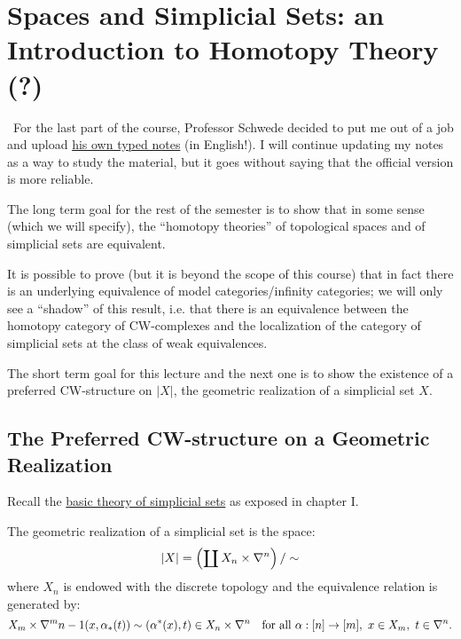 
\chapter{Spaces and Simplicial Sets: an Introduction to Homotopy Theory (?)}\label{chapter:the-cool-chapter}

\Attention\ For the last part of the course, Professor Schwede decided to put me out of a job and upload \href{https://www.math.uni-bonn.de/people/schwede/sset_vs_spaces.pdf}{his own typed notes} (in English!). I will continue updating my notes as a way to study the material, but it goes without saying that the official version is more reliable.\medskip


The long term goal for the rest of the semester is to show that in some sense (which we will specify), the \enquote{homotopy theories} of topological spaces and of simplicial sets are equivalent.

It is possible to prove (but it is beyond the scope of this course) that in fact there is an underlying equivalence of model categories/infinity categories; we will only see a \enquote{shadow} of this result, i.e. that there is an equivalence between the homotopy category of CW-complexes and the localization of the category of simplicial sets at the class of weak equivalences.

The short term goal for this lecture and the next one is to show the existence of a preferred CW-structure on $|X|$, the geometric realization of a simplicial set $X$.

\section{The Preferred CW-structure on a Geometric Realization}
Recall the \hyperref[section:reminder-on-sset]{basic theory of simplicial sets} as exposed in chapter I.

The geometric realization of a simplicial set is the space:
\[|X|=\left(\coprod X_n\times\nabla^n\right)/\sim\]
where $X_n$ is endowed with the discrete topology and the equivalence relation is generated by:
\[X_m\times\nabla^m\cont(x,\alpha_*(t))\sim(\alpha^*(x),t)\in X_n\times\nabla^n\quad\text{for all }\alpha:[n]\to[m],\ x\in X_m,\ t\in\nabla^n.\]

